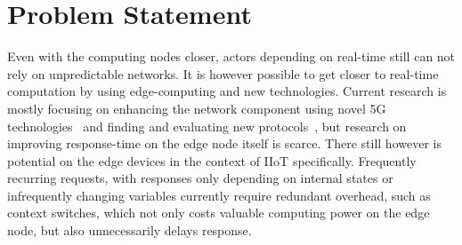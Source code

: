 \section{Problem Statement}

Even with the computing nodes closer, actors depending on real-time still can
not rely on unpredictable networks. It is however possible to get closer to
real-time computation by using edge-computing and new technologies. Current
research is mostly focusing on enhancing the network component using novel 5G
technologies~\cite{nunna_enabling_2015} and finding and evaluating new
protocols~\cite{suriyachai_survey_2012}, but research on improving response-time
on the edge node itself is scarce. There still however is potential on the edge
devices in the context of IIoT specifically. Frequently recurring requests, with
responses only depending on internal states or infrequently changing variables
currently require redundant overhead, such as context switches, which not only
costs valuable computing power on the edge node, but also unnecessarily delays
response.





